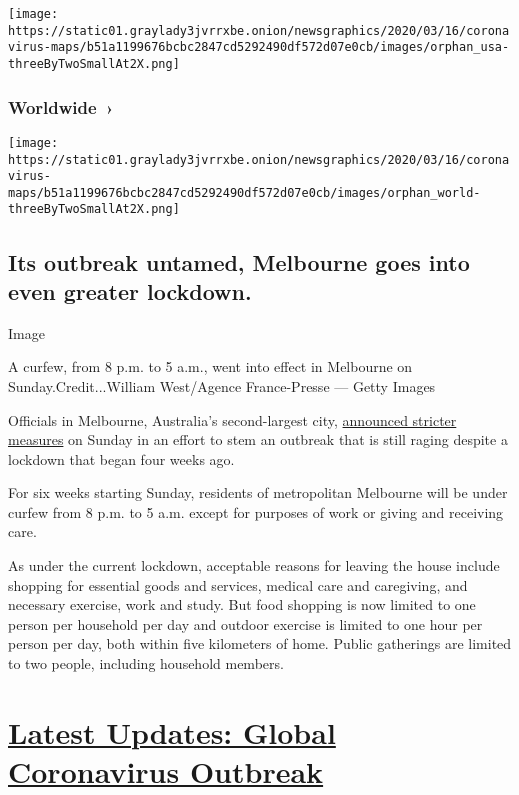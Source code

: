 \texttt{[image: https://static01.graylady3jvrrxbe.onion/newsgraphics/2020/03/16/coronavirus-maps/b51a1199676bcbc2847cd5292490df572d07e0cb/images/orphan\_usa-threeByTwoSmallAt2X.png]}

\href{https://www.nytimes3xbfgragh.onion/interactive/2020/world/coronavirus-maps.html}{}

\hypertarget{worldwide-}{%
\subsubsection{Worldwide~›}\label{worldwide-}}

\texttt{[image: https://static01.graylady3jvrrxbe.onion/newsgraphics/2020/03/16/coronavirus-maps/b51a1199676bcbc2847cd5292490df572d07e0cb/images/orphan\_world-threeByTwoSmallAt2X.png]}

\hypertarget{its-outbreak-untamed-melbourne-goes-into-even-greater-lockdown}{%
\subsection{Its outbreak untamed, Melbourne goes into even greater
lockdown.}\label{its-outbreak-untamed-melbourne-goes-into-even-greater-lockdown}}

Image

A curfew, from 8 p.m. to 5 a.m., went into effect in Melbourne on
Sunday.Credit...William West/Agence France-Presse --- Getty Images

Officials in Melbourne, Australia's second-largest city,
\href{https://www.premier.vic.gov.au/statement-changes-melbournes-restrictions}{announced
stricter measures} on Sunday in an effort to stem an outbreak that is
still raging despite a lockdown that began four weeks ago.

For six weeks starting Sunday, residents of metropolitan Melbourne will
be under curfew from 8 p.m. to 5 a.m. except for purposes of work or
giving and receiving care.

As under the current lockdown, acceptable reasons for leaving the house
include shopping for essential goods and services, medical care and
caregiving, and necessary exercise, work and study. But food shopping is
now limited to one person per household per day and outdoor exercise is
limited to one hour per person per day, both within five kilometers of
home. Public gatherings are limited to two people, including household
members.

\hypertarget{latest-updates-global-coronavirus-outbreak}{%
\section{\texorpdfstring{\href{https://www.nytimes3xbfgragh.onion/2020/08/03/world/coronavirus-covid-19.html?action=click\&pgtype=Article\&state=default\&region=MAIN_CONTENT_1\&context=storylines_live_updates}{Latest
Updates: Global Coronavirus
Outbreak}}{Latest Updates: Global Coronavirus Outbreak}}\label{latest-updates-global-coronavirus-outbreak}}

